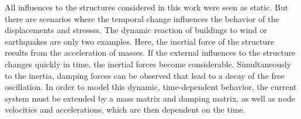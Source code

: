   All influences to the structures considered in this work were seen as static. But there are scenarios where the temporal change influences the behavior of the displacements and stresses. The dynamic reaction of buildings to wind or earthquakes are only two examples. Here, the inertial force of the structure results from the acceleration of masses. If the external influences to the structure changes quickly in time, the inertial forces become considerable. Simultaneously to the inertia, damping forces can be observed that lead to a decay of the free oscillation. In order to model this dynamic, time-dependent behavior, the current system must be extended by a mass matrix and damping matrix, as well as node velocities and accelerations, which are then dependent on the time.